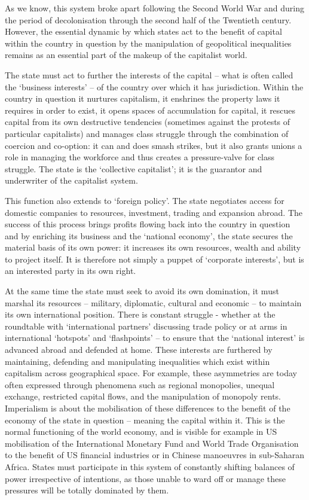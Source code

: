 As we know, this system broke apart following the Second World War and during the period of decolonisation through the second half of the Twentieth century.
However, the essential dynamic by which states act to the benefit of capital within the country in question by the manipulation of geopolitical inequalities remains as an essential part of the makeup of the capitalist world.

The state must act to further the interests of the capital – what is often called the ‘business interests’ – of the country over which it has jurisdiction.
Within the country in question it nurtures capitalism, it enshrines the property laws it requires in order to exist, it opens spaces of accumulation for capital, it rescues capital from its own destructive tendencies (sometimes against the protests of particular capitalists) and manages class struggle through the combination of coercion and co-option: it can and does smash strikes, but it also grants unions a role in managing the workforce and thus creates a pressure-valve for class struggle.
The state is the ‘collective capitalist’; it is the guarantor and underwriter of the capitalist system.

This function also extends to ‘foreign policy’.
The state negotiates access for domestic companies to resources, investment, trading and expansion abroad.
The success of this process brings profits flowing back into the country in question and by enriching its business and the ‘national economy’, the state secures the material basis of its own power: it increases its own resources, wealth and ability to project itself.
It is therefore not simply a puppet of ‘corporate interests’, but is an interested party in its own right.

At the same time the state must seek to avoid its own domination, it must marshal its resources – military, diplomatic, cultural and economic – to maintain its own international position.
There is constant struggle - whether at the roundtable with ‘international partners’ discussing trade policy or at arms in international ‘hotspots’ and ‘flashpoints’ – to ensure that the ‘national interest’ is advanced abroad and defended at home.
These interests are furthered by maintaining, defending and manipulating inequalities which exist within capitalism across geographical space.
For example, these asymmetries are today often expressed through phenomena such as regional monopolies, unequal exchange, restricted capital flows, and the manipulation of monopoly rents.
Imperialism is about the mobilisation of these differences to the benefit of the economy of the state in question – meaning the capital within it.
This is the normal functioning of the world economy, and is visible for example in US mobilisation of the International Monetary Fund and World Trade Organisation to the benefit of US financial industries or in Chinese manoeuvres in sub-Saharan Africa.
States must participate in this system of constantly shifting balances of power irrespective of intentions, as those unable to ward off or manage these pressures will be totally dominated by them.

